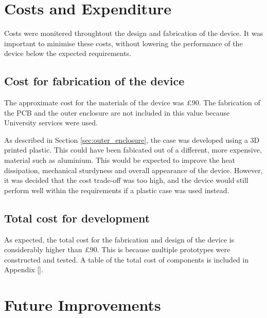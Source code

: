 \documentclass[a4paper,12pt]{article}
\begin{document}



\newpage
\section{Costs and Expenditure}
\label{sec:cost}

Costs were monitered throughtout the design and fabrication of the device. It was important to minimise these costs, without lowering the performance of the device below the expected requirements.

\subsection{Cost for fabrication of the device}
\label{sec:device_cost}

The approximate cost for the materials of the device was £90. The fabrication of the PCB and the outer enclosure are not included in this value because University services were used.

As described in Section \ref{sec:outer_enclosure}, the case was developed using a 3D printed plastic. This could have been fabicated out of a different, more expensive, material such as aluminium. This would be expected to improve the heat dissipation, mechanical sturdyness and overall appearance of the device. However, it was decided that the cost trade-off was too high, and the device would still perform well within the requirements if a plastic case was used instead.

\subsection{Total cost for development}
\label{sec:total_cost}

As expected, the total cost for the fabrication and design of the device is considerably higher than £90. This is because multiple prototypes were constructed and tested. A table of the total cost of components is included in Appendix \ref{}.


\newpage
\section{Future Improvements}
\label{sec:future_improvements}
\end{document}
